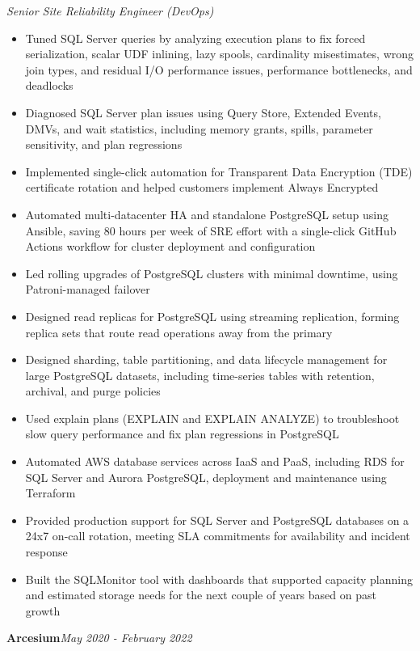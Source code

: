 \documentclass[10pt,a4paper]{article}
\begin{document}
\textit{Senior Site Reliability Engineer (DevOps)}\\[-5pt]
\begin{itemize}
  \item Tuned SQL Server queries by analyzing execution plans to fix forced serialization, scalar UDF inlining, lazy spools, cardinality misestimates, wrong join types, and residual I/O performance issues, performance bottlenecks, and deadlocks
  \item Diagnosed SQL Server plan issues using Query Store, Extended Events, DMVs, and wait statistics, including memory grants, spills, parameter sensitivity, and plan regressions
  \item Implemented single-click automation for Transparent Data Encryption (TDE) certificate rotation and helped customers implement Always Encrypted
  \item Automated multi-datacenter HA and standalone PostgreSQL setup using Ansible, saving 80 hours per week of SRE effort with a single-click GitHub Actions workflow for cluster deployment and configuration
  \item Led rolling upgrades of PostgreSQL clusters with minimal downtime, using Patroni-managed failover
  \item Designed read replicas for PostgreSQL using streaming replication, forming replica sets that route read operations away from the primary
  \item Designed sharding, table partitioning, and data lifecycle management for large PostgreSQL datasets, including time-series tables with retention, archival, and purge policies
  \item Used explain plans (EXPLAIN and EXPLAIN ANALYZE) to troubleshoot slow query performance and fix plan regressions in PostgreSQL
  \item Automated AWS database services across IaaS and PaaS, including RDS for SQL Server and Aurora PostgreSQL, deployment and maintenance using Terraform
  \item Provided production support for SQL Server and PostgreSQL databases on a 24x7 on-call rotation, meeting SLA commitments for availability and incident response
  \item Built the SQLMonitor tool with dashboards that supported capacity planning and estimated storage needs for the next couple of years based on past growth
\end{itemize}
\vspace{14.7pt}
\noindent\textbf{Arcesium}\hfill \textit{May 2020 - February 2022}
\end{document}
